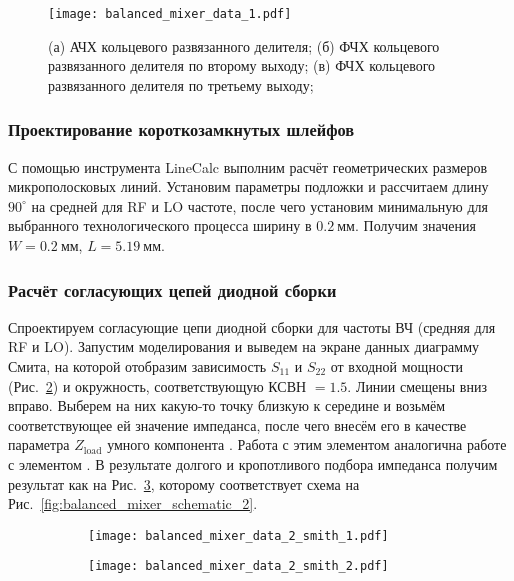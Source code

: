 \begin{figure}[!ht]
    \centering
    \texttt{[image: balanced\_mixer\_data\_1.pdf]}
    \caption{%
        (а) АЧХ кольцевого развязанного делителя;
        (б) ФЧХ кольцевого развязанного делителя по второму выходу;
        (в) ФЧХ кольцевого развязанного делителя по третьему выходу;
    }%
    \label{fig:balanced_mixer_data_1}
\end{figure}

\subsubsection{Проектирование короткозамкнутых шлейфов}

С помощью инструмента LineCalc выполним расчёт геометрических размеров микрополосковых линий.
Установим параметры подложки и рассчитаем длину $90^\circ$ на средней для RF и LO частоте, после чего установим минимальную для выбранного технологического процесса ширину в $0.2~\text{мм}$.
Получим значения $W = 0.2~\text{мм}$, $L = 5.19~\text{мм}$.

\subsubsection{Расчёт согласующих цепей диодной сборки}

Спроектируем согласующие цепи диодной сборки для частоты ВЧ (средняя для RF и LO).
Запустим моделирования и выведем на экране данных диаграмму Смита, на которой отобразим зависимость $S_{11}$ и $S_{22}$ от входной мощности (Рис.~\ref{fig:balanced_mixer_data_2_smith_1}) и окружность, соответствующую $\text{КСВН } = 1.5$.
Линии смещены вниз вправо.
Выберем на них какую-то точку близкую к середине и возьмём соответствующее ей значение импеданса, после чего внесём его в качестве параметра $Z_\text{load}$ умного компонента .
Работа с этим элементом аналогична работе с элементом .
В результате долгого и кропотливого подбора импеданса получим результат как на Рис.~\ref{fig:balanced_mixer_data_2_smith_2}, которому соответствует схема на Рис.~\ref{fig:balanced_mixer_schematic_2}.

\begin{figure}[!ht]
    \centering
    \begin{subfigure}[b]{0.45\textwidth}
        \centering
        \texttt{[image: balanced\_mixer\_data\_2\_smith\_1.pdf]}
        \caption{}%
        \label{fig:balanced_mixer_data_2_smith_1}
    \end{subfigure}
    \hfill
    \begin{subfigure}[b]{0.45\textwidth}
        \centering
        \texttt{[image: balanced\_mixer\_data\_2\_smith\_2.pdf]}
        \caption{}%
        \label{fig:balanced_mixer_data_2_smith_2}
    \end{subfigure}
    \caption{%
    }%
    \label{fig:balanced_mixer_data_2}
\end{figure}

